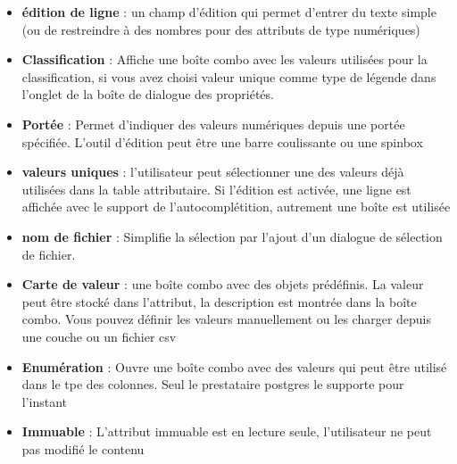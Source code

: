 \begin{itemize}[label=--]
\item \textbf{édition de ligne} : un champ d'édition qui permet d'entrer du 
texte simple (ou de restreindre à des nombres pour des attributs de type 
numériques)
\item \textbf{Classification} : Affiche une boîte combo avec les valeurs 
utilisées pour la classification, si vous avez choisi valeur unique comme type 
de légende dans l'onglet  de la boîte de dialogue des propriétés.
\item \textbf{Portée} : Permet d'indiquer des valeurs numériques depuis une 
portée spécifiée. L'outil d'édition peut être une barre coulissante ou une 
spinbox
\item \textbf{valeurs uniques} : l'utilisateur peut sélectionner une des valeurs 
déjà utilisées dans la table attributaire. Si l'édition est activée, une ligne 
est affichée avec le support de l'autocomplétition, autrement une boîte est 
utilisée
\item \textbf{nom de fichier} : Simplifie la sélection par l'ajout d'un dialogue 
de sélection de fichier.
\item \textbf{Carte de valeur} : une boîte combo avec des objets prédéfinis. La 
valeur peut être stocké dans l'attribut, la description est montrée dans la 
boîte combo. Vous pouvez définir les valeurs manuellement ou les charger depuis 
une couche ou un fichier csv
\item \textbf{Enumération} : Ouvre une boîte combo avec des valeurs qui peut 
être utilisé dans le tpe des colonnes. Seul le prestataire postgres le supporte 
pour l'instant
\item \textbf{Immuable} : L'attribut immuable est en lecture seule, l'utilisateur 
ne peut pas modifié le contenu
\end{itemize}

